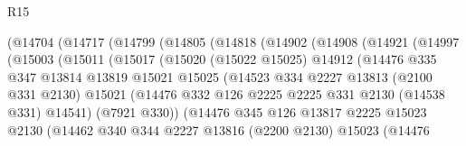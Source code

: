 \begin{lexlean}{R15}
\begin{coremodule}
                (@14704
                  (@14717
                    (@14799
                      (@14805
                        (@14818
                          (@14902
                            (@14908
                              (@14921
                                (@14997
                                  (@15003
                                    (@15011
                                      (@15017
                                        (@15020
                                          (@15022 @15025)
                                          @14912
                                          (@14476
                                            @335
                                            @347
                                            @13814
                                            @13819
                                            @15021
                                            @15025
                                            (@14523
                                              @334
                                              @2227
                                              @13813
                                              (@2100 @331 @2130)
                                              @15021
                                              (@14476
                                                @332
                                                @126
                                                @2225
                                                @2225
                                                @331
                                                @2130
                                                (@14538 @331)
                                                @14541)
                                              (@7921 @330))
                                            (@14476
                                              @345
                                              @126
                                              @13817
                                              @2225
                                              @15023
                                              @2130
                                              (@14462
                                                @340
                                                @344
                                                @2227
                                                @13816
                                                (@2200 @2130)
                                                @15023
                                                (@14476

\end{coremodule}
\end{lexlean}
